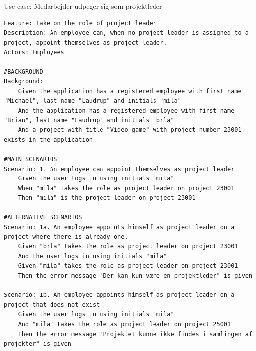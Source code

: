 \begin{listing}[H]
    \centering
    \caption{Use case: Medarbejder udpeger sig som projektleder} \label{lst:usecase_bliv_projektleder}
    \begin{verbatim}  
Feature: Take on the role of project leader
Description: An employee can, when no project leader is assigned to a project, appoint themselves as project leader.
Actors: Employees

#BACKGROUND
Background:
    Given the application has a registered employee with first name "Michael", last name "Laudrup" and initials "mila"
    And the application has a registered employee with first name "Brian", last name "Laudrup" and initials "brla"
    And a project with title "Video game" with project number 23001 exists in the application

#MAIN SCENARIOS
Scenario: 1. An employee can appoint themselves as project leader
    Given the user logs in using initials "mila"
    When "mila" takes the role as project leader on project 23001
    Then "mila" is the project leader on project 23001

#ALTERNATIVE SCENARIOS
Scenario: 1a. An employee appoints himself as project leader on a project where there is already one.
    Given "brla" takes the role as project leader on project 23001
    And the user logs in using initials "mila"
    Given "mila" takes the role as project leader on project 23001
    Then the error message "Der kan kun være en projektleder" is given

Scenario: 1b. An employee appoints himself as project leader on a project that does not exist
    Given the user logs in using initials "mila"
    And "mila" takes the role as project leader on project 25001
    Then the error message "Projektet kunne ikke findes i samlingen af projekter" is given
    \end{verbatim}
\end{listing}
